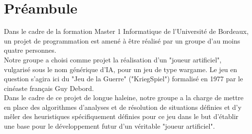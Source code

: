    \chapter*{Préambule}

	Dans le cadre de la formation Master 1 Informatique de l'Université de Bordeaux, un projet de programmation est amené à être réalisé par un groupe d'au moins quatre personnes.\\
	
	Notre groupe a choisi comme projet la réalisation d'un "joueur artificiel", vulgarisé sous le nom générique d'IA, pour un jeu de type wargame. Le jeu en question s'agira ici du "Jeu de la Guerre" ("KriegSpiel") formalisé en 1977 par le cinéaste français Guy Debord.\\
	
	Dans le cadre de ce projet de longue haleine, notre groupe a la charge de mettre en place des algorithmes d'analyses et de résolution de situations définies et d'y mêler des heuristiques spécifiquement définies pour ce jeu dans le but d'établir une base pour le développement futur d'un véritable "joueur artificiel". \\